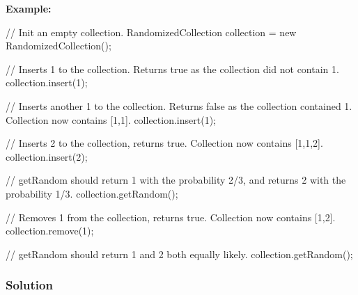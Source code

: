 \textbf{Example:}
\begin{Code}
// Init an empty collection.
RandomizedCollection collection = new RandomizedCollection();

// Inserts 1 to the collection. Returns true as the collection did not contain 1.
collection.insert(1);

// Inserts another 1 to the collection. Returns false as the collection contained 1. Collection now contains [1,1].
collection.insert(1);

// Inserts 2 to the collection, returns true. Collection now contains [1,1,2].
collection.insert(2);

// getRandom should return 1 with the probability 2/3, and returns 2 with the probability 1/3.
collection.getRandom();

// Removes 1 from the collection, returns true. Collection now contains [1,2].
collection.remove(1);

// getRandom should return 1 and 2 both equally likely.
collection.getRandom();
\end{Code}
\newpage

\subsubsection{Solution}


